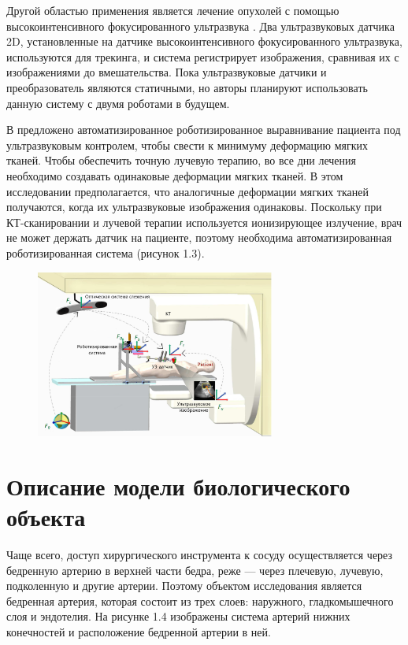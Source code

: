 Другой областью применения является лечение опухолей с помощью высокоинтенсивного фокусированного ультразвука \cite{litlink7}. Два ультразвуковых датчика 2D, установленные на датчике высокоинтенсивного фокусированного ультразвука, используются для трекинга, и система регистрирует изображения, сравнивая их с изображениями до вмешательства. Пока ультразвуковые датчики и преобразователь являются статичными, но авторы планируют использовать данную систему с двумя роботами в будущем.

В \cite{litlink8} предложено автоматизированное роботизированное выравнивание пациента под ультразвуковым контролем, чтобы свести к минимуму деформацию мягких тканей. Чтобы обеспечить точную лучевую терапию, во все дни лечения необходимо создавать одинаковые деформации мягких тканей. В этом исследовании предполагается, что аналогичные деформации мягких тканей получаются, когда их ультразвуковые изображения одинаковы. Поскольку при КТ-сканировании и лучевой терапии используется ионизирующее излучение, врач не может держать датчик на пациенте, поэтому необходима автоматизированная роботизированная система (рисунок 1.3).

\begin{figure}[!h]
\begin{center}
\includegraphics[width=0.7\textwidth]{Рисунки/система слежения.png}
\caption{\centering {}}
\label{част}
\end{center}
\end{figure}

\section{Описание модели биологического объекта}

Чаще всего, доступ хирургического инструмента к сосуду осуществляется через бедренную артерию в верхней части бедра, реже — через плечевую, лучевую, подколенную и другие артерии. Поэтому объектом исследования является бедренная артерия, которая состоит из трех слоев: наружного, гладкомышечного слоя и эндотелия. На рисунке 1.4 изображены система артерий нижних конечностей и расположение бедренной артерии в ней.

